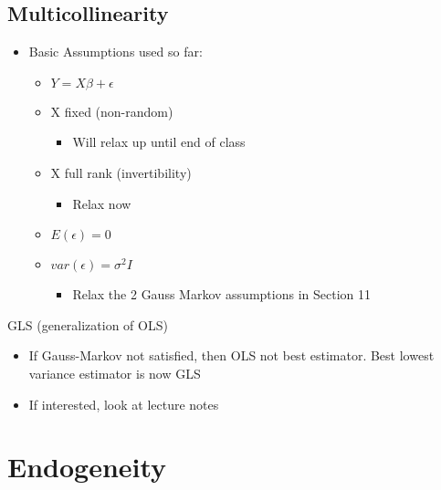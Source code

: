 \documentclass[10pt, oneside]{article}
\begin{document}
\subsection{Multicollinearity}
\begin{itemize}
    \item Basic Assumptions used so far:
    \begin{itemize}
        \item $Y=X\beta + \epsilon$
        \item X fixed (non-random)
        \begin{itemize}
            \item Will relax up until end of class
        \end{itemize}
        \item X full rank (invertibility)
        \begin{itemize}
            \item Relax now
        \end{itemize}
        \item $E(\epsilon)=0$
        \item $var(\epsilon) = \sigma^2 I$
        \begin{itemize}
            \item Relax the 2 Gauss Markov assumptions in Section 11
        \end{itemize}
    \end{itemize}
\end{itemize}
GLS (generalization of OLS)
\begin{itemize}
    \item If Gauss-Markov not satisfied, then OLS not best estimator. Best lowest variance estimator is now GLS
    \item If interested, look at lecture notes
\end{itemize}
\section{Endogeneity}
\end{document}
